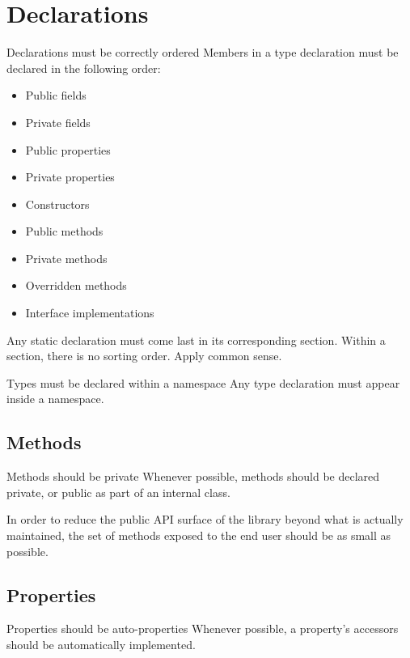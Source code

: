 \documentclass[11pt,a4paper]{article}
\begin{document}
\section{Declarations}
\begin{must}{Declarations must be correctly ordered}
Members in a type declaration must be declared in the following order:
\begin{itemize}
\item Public fields
\item Private fields
\item Public properties
\item Private properties
\item Constructors
\item Public methods
\item Private methods
\item Overridden methods
\item Interface implementations
\end{itemize}

Any static declaration must come last in its corresponding section. Within a section, there is no sorting order. Apply common sense.
\end{must}

\begin{must}{Types must be declared within a namespace}
Any type declaration must appear inside a namespace.
\end{must}

\subsection{Methods}
\begin{should}{Methods should be private}
Whenever possible, methods should be declared private, or public as part of an internal class.
\end{should}

In order to reduce the public API surface of the library beyond what is actually maintained, the set of methods exposed to the end user should be as small as possible.

\subsection{Properties}
\begin{should}{Properties should be auto-properties}
Whenever possible, a property's accessors should be automatically implemented.
\end{should}
\end{document}
